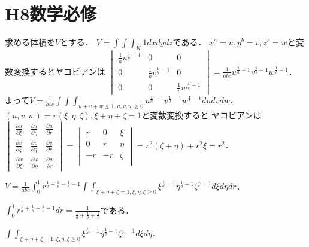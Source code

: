\documentclass[
		book,
		head_space=20mm,
		foot_space=20mm,
		gutter=10mm,
		line_length=190mm
]{jlreq}
\begin{document}
\section{H8数学必修}
求める体積を$V$とする．
$V=\int \int\int_K 1 dxdydz$である．
$x^a=u,y^b=v,z^c=w$と変数変換するとヤコビアンは
$\begin{vmatrix}
    \frac{1}{a}u^{\frac{1}{a}-1} & 0 & 0 \\
    0 & \frac{1}{b}v^{\frac{1}{b}-1} & 0 \\
    0 & 0 & \frac{1}{c}w^{\frac{1}{c}-1}
\end{vmatrix}=\frac{1}{abc}u^{\frac{1}{a}-1}v^{\frac{1}{b}-1}w^{\frac{1}{c}-1}$．
よって$V=\frac{1}{abc}\int \int\int_{u+v+w\le 1,u,v,w\ge0} u^{\frac{1}{a}-1}v^{\frac{1}{b}-1}w^{\frac{1}{c}-1} dudvdw$．
$(u,v,w)=r(\xi,\eta,\zeta), \xi+\eta+\zeta=1$と変数変換すると
ヤコビアンは$\begin{vmatrix}
    \frac{\partial u}{\partial \xi} & \frac{\partial u}{\partial \eta} & \frac{\partial u}{\partial r} \\
    \frac{\partial v}{\partial \xi} & \frac{\partial v}{\partial \eta} & \frac{\partial v}{\partial r} \\
    \frac{\partial w}{\partial \xi} & \frac{\partial w}{\partial \eta} & \frac{\partial w}{\partial r}
\end{vmatrix}=\begin{vmatrix}
    r & 0 & \xi \\
    0 & r & \eta \\
    -r & -r & \zeta \\
\end{vmatrix}=r^2(\zeta+\eta)+r^2\xi=r^2$．

$V=\frac{1}{abc}\int_0^1 r^{\frac{1}{a}+\frac{1}{b}+\frac{1}{c}-1}\int  \int_{\xi+\eta+\zeta=1,\xi,\eta,\zeta\ge0} \xi^{\frac{1}{a}-1}\eta^{\frac{1}{b}-1}\zeta^{\frac{1}{c}-1} d\xi d\eta  dr$．

$\int_0^1 r^{\frac{1}{a}+\frac{1}{b}+\frac{1}{c}-1}dr=\frac{1}{\frac{1}{a}+\frac{1}{b}+\frac{1}{c}}$である．

$\int\int_{\xi+\eta+\zeta=1,\xi,\eta,\zeta\ge0} \xi^{\frac{1}{a}-1}\eta^{\frac{1}{b}-1}\zeta^{\frac{1}{c}-1} d\xi d\eta$．
\end{document}
